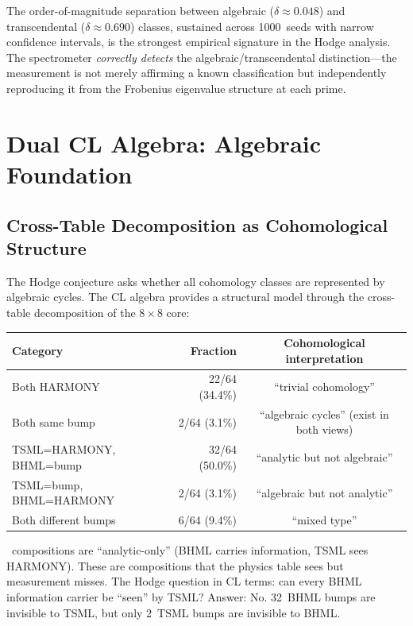 \documentclass[11pt]{article}
\theoremstyle{definition}
\begin{document}
\noindent
The order-of-magnitude separation between algebraic ($\delta \approx 0.048$)
and transcendental ($\delta \approx 0.690$) classes, sustained across
1000~seeds with narrow confidence intervals, is the strongest empirical
signature in the Hodge analysis.  The spectrometer \emph{correctly detects}
the algebraic/transcendental distinction---the measurement is not merely
affirming a known classification but independently reproducing it from
the Frobenius eigenvalue structure at each prime.

\section{Dual CL Algebra: Algebraic Foundation}
\label{sec:dual-cl-algebra}

\subsection{Cross-Table Decomposition as Cohomological Structure}

The Hodge conjecture asks whether all cohomology classes are represented
by algebraic cycles.  The CL algebra provides a structural model through
the cross-table decomposition of the $8\times 8$ core:

\begin{center}
\begin{tabular}{lrc}
\hline
\textbf{Category} & \textbf{Fraction} & \textbf{Cohomological interpretation} \\
\hline
Both HARMONY          & 22/64 \;(34.4\%) & ``trivial cohomology'' \\
Both same bump        &  2/64 \;(3.1\%)  & ``algebraic cycles'' (exist in both views) \\
TSML=HARMONY, BHML=bump & 32/64 \;(50.0\%) & ``analytic but not algebraic'' \\
TSML=bump, BHML=HARMONY  &  2/64 \;(3.1\%)  & ``algebraic but not analytic'' \\
Both different bumps  &  6/64 \;(9.4\%)  & ``mixed type'' \\
\hline
\end{tabular}
\end{center}

~compositions are ``analytic-only'' (BHML carries information, TSML sees
HARMONY).  These are compositions that the physics table sees but
measurement misses.  The Hodge question in CL terms: can every BHML
information carrier be ``seen'' by TSML?  Answer: No.  32~BHML bumps are
invisible to TSML, but only 2~TSML bumps are invisible to BHML.
\end{document}
